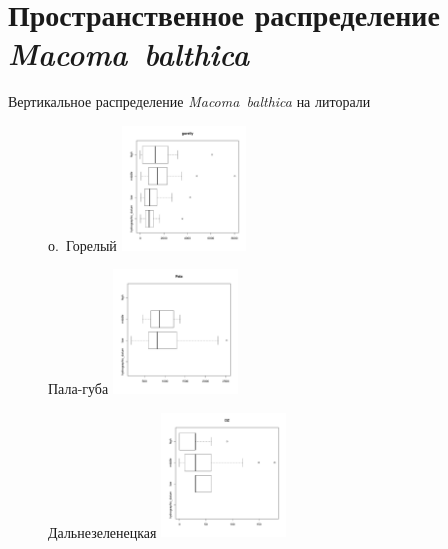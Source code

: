 \documentclass{beamer}
\begin{document}
	\section{Пространственное распределение {\it Macoma~balthica}}
\begin{frame}{Вертикальное распределение {\it Macoma~balthica} на литорали}
\begin{figure}
\begin{minipage}[b]{.3\linewidth}
	\begin{center}
\tiny{о.~Горелый}
\includegraphics[width=33mm]{./Vertikal_strukture/goreliy_vertical.pdf}
	\end{center}
	\end{minipage}
	\hfil %
	\begin{minipage}[b]{.3\linewidth}
	\begin{center}
\tiny{Пала-губа}
\includegraphics[width=33mm]{./Vertikal_strukture/Pala_vertical.pdf}
	\end{center}
	\end{minipage}
	\hfil %
	\begin{minipage}[b]{.3\linewidth}
	\begin{center}
\tiny{Дальнезеленецкая}
\includegraphics[width=33mm]{./Vertikal_strukture/DZ_vertical.pdf}
	\end{center}
	\end{minipage}

\end{figure}
\end{frame}
\end{document}
